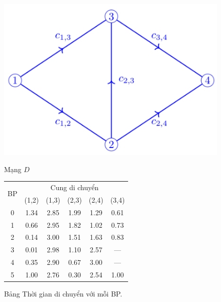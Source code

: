 \documentclass[../main.tex]{subfiles}
\begin{document}
\begin{figure}[H]
\centering
\begin{minipage}[b]{0.45\textwidth}
  \centering
  \includegraphics{edited-images/Figure2.jpg}
  \caption{Mạng \(D\)}
  \label{fig:2}
\end{minipage}
\begin{minipage}[b]{0.45\textwidth}
  \centering
  \begin{small}
      \caption{Bảng Thời gian di chuyển với mỗi BP.}
      \label{table:1}
      \begin{tabular}{|c||ccccc|}
      \toprule
      \multirow{2}{*}{BP} & \multicolumn{5}{c|}{Cung di chuyển}                                                                                       \\ \cmidrule{2-6} 
                          & \multicolumn{1}{c|}{(1,2)} & \multicolumn{1}{c|}{(1,3)} & \multicolumn{1}{c|}{(2,3)} & \multicolumn{1}{c|}{(2,4)} & (3,4) \\ \midrule
      0                   & \multicolumn{1}{c|}{1.34}  & \multicolumn{1}{c|}{2.85}  & \multicolumn{1}{c|}{1.99}  & \multicolumn{1}{c|}{1.29}  & 0.61  \\ \midrule
      1                   & \multicolumn{1}{c|}{0.66}  & \multicolumn{1}{c|}{2.95}  & \multicolumn{1}{c|}{1.82}  & \multicolumn{1}{c|}{1.02}  & 0.73  \\ \midrule
      2                   & \multicolumn{1}{c|}{0.14}  & \multicolumn{1}{c|}{3.00}  & \multicolumn{1}{c|}{1.51}  & \multicolumn{1}{c|}{1.63}  & 0.83  \\ \midrule
      3                   & \multicolumn{1}{c|}{0.01}  & \multicolumn{1}{c|}{2.98}  & \multicolumn{1}{c|}{1.10}  & \multicolumn{1}{c|}{2.57}  & ---     \\ \midrule
      4                   & \multicolumn{1}{c|}{0.35}  & \multicolumn{1}{c|}{2.90}  & \multicolumn{1}{c|}{0.67}  & \multicolumn{1}{c|}{3.00}  & ---     \\ \midrule
      5                   & \multicolumn{1}{c|}{1.00}  & \multicolumn{1}{c|}{2.76}  & \multicolumn{1}{c|}{0.30}  & \multicolumn{1}{c|}{2.54}  & 1.00  \\ \bottomrule
      \end{tabular}
  \end{small}
\end{minipage}

\end{figure}
\end{document}
